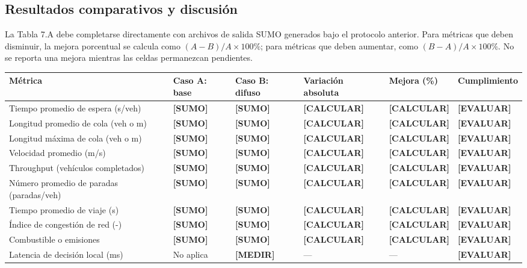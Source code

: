 \documentclass[12pt,a4paper,oneside]{report}
\begin{document}
\subsection{Resultados comparativos y discusión}\label{resultados-comparativos-v2}

La Tabla 7.A debe completarse directamente con archivos de salida SUMO generados bajo el protocolo anterior. Para métricas que deben disminuir, la mejora porcentual se calcula como \((A-B)/A\times100\%\); para métricas que deben aumentar, como \((B-A)/A\times100\%\). No se reporta una mejora mientras las celdas permanezcan pendientes.

\begin{landscape}
\footnotesize
{}
\label{tbl:resultados-sumo-v2}
\begin{longtable}{@{}p{5.0cm}p{3.6cm}p{3.6cm}p{3.6cm}p{3.4cm}p{3.0cm}@{}}
\toprule
\textbf{Métrica} & \textbf{Caso A: base} & \textbf{Caso B: difuso} & \textbf{Variación absoluta} & \textbf{Mejora (\%)} & \textbf{Cumplimiento}\\
\midrule
\endhead
Tiempo promedio de espera (s/veh) & \textbf{[SUMO]} & \textbf{[SUMO]} & \textbf{[CALCULAR]} & \textbf{[CALCULAR]} & \textbf{[EVALUAR]}\\
Longitud promedio de cola (veh o m) & \textbf{[SUMO]} & \textbf{[SUMO]} & \textbf{[CALCULAR]} & \textbf{[CALCULAR]} & \textbf{[EVALUAR]}\\
Longitud máxima de cola (veh o m) & \textbf{[SUMO]} & \textbf{[SUMO]} & \textbf{[CALCULAR]} & \textbf{[CALCULAR]} & \textbf{[EVALUAR]}\\
Velocidad promedio (m/s) & \textbf{[SUMO]} & \textbf{[SUMO]} & \textbf{[CALCULAR]} & \textbf{[CALCULAR]} & \textbf{[EVALUAR]}\\
Throughput (vehículos completados) & \textbf{[SUMO]} & \textbf{[SUMO]} & \textbf{[CALCULAR]} & \textbf{[CALCULAR]} & \textbf{[EVALUAR]}\\
Número promedio de paradas (paradas/veh) & \textbf{[SUMO]} & \textbf{[SUMO]} & \textbf{[CALCULAR]} & \textbf{[CALCULAR]} & \textbf{[EVALUAR]}\\
Tiempo promedio de viaje (s) & \textbf{[SUMO]} & \textbf{[SUMO]} & \textbf{[CALCULAR]} & \textbf{[CALCULAR]} & \textbf{[EVALUAR]}\\
Índice de congestión de red (-) & \textbf{[SUMO]} & \textbf{[SUMO]} & \textbf{[CALCULAR]} & \textbf{[CALCULAR]} & \textbf{[EVALUAR]}\\
Combustible o emisiones & \textbf{[SUMO]} & \textbf{[SUMO]} & \textbf{[CALCULAR]} & \textbf{[CALCULAR]} & \textbf{[EVALUAR]}\\
Latencia de decisión local (ms) & No aplica & \textbf{[MEDIR]} & --- & --- & \textbf{[EVALUAR]}\\
\bottomrule
\end{longtable}
\end{landscape}
\end{document}
